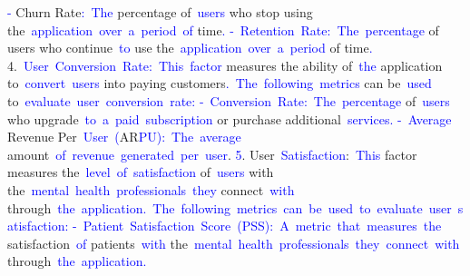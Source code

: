 \documentclass{article}
\begin{document}
\begin{tcolorbox}[colframe=black,colback=white]
{}\textcolor{blue}{-} Churn Rate\textcolor{blue}{:}\textcolor{blue}{~The} percentage of\textcolor{blue}{~users} who stop using the\textcolor{blue}{~application}\textcolor{blue}{~over}\textcolor{blue}{~a}\textcolor{blue}{~period}\textcolor{blue}{~of} time\textcolor{blue}{.
}\textcolor{blue}{-}\textcolor{blue}{~Ret}\textcolor{blue}{ention}\textcolor{blue}{~Rate}\textcolor{blue}{:}\textcolor{blue}{~The}\textcolor{blue}{~percentage} of users who continue\textcolor{blue}{~to} use the\textcolor{blue}{~application}\textcolor{blue}{~over}\textcolor{blue}{~a}\textcolor{blue}{~period} of time\textcolor{blue}{.
}4.\textcolor{blue}{~User}\textcolor{blue}{~Conversion}\textcolor{blue}{~Rate}\textcolor{blue}{:}\textcolor{blue}{~This}\textcolor{blue}{~factor} measures the ability of\textcolor{blue}{~the} application to\textcolor{blue}{~convert}\textcolor{blue}{~users} into paying customers\textcolor{blue}{.}\textcolor{blue}{~The}\textcolor{blue}{~following}\textcolor{blue}{~metrics} can be\textcolor{blue}{~used} to\textcolor{blue}{~evaluate}\textcolor{blue}{~user}\textcolor{blue}{~conversion}\textcolor{blue}{~rate}\textcolor{blue}{:
}\textcolor{blue}{-}\textcolor{blue}{~Conversion}\textcolor{blue}{~Rate}\textcolor{blue}{:}\textcolor{blue}{~The}\textcolor{blue}{~percentage} of\textcolor{blue}{~users} who upgrade\textcolor{blue}{~to}\textcolor{blue}{~a}\textcolor{blue}{~paid}\textcolor{blue}{~subscription} or purchase additional\textcolor{blue}{~services}\textcolor{blue}{.
}\textcolor{blue}{-}\textcolor{blue}{~Average} Revenue Per\textcolor{blue}{~User}\textcolor{blue}{~(}AR\textcolor{blue}{PU}\textcolor{blue}{):}\textcolor{blue}{~The}\textcolor{blue}{~average} amount\textcolor{blue}{~of}\textcolor{blue}{~revenue}\textcolor{blue}{~generated}\textcolor{blue}{~per}\textcolor{blue}{~user}.
\textcolor{blue}{5}. User\textcolor{blue}{~Satisfaction}:\textcolor{blue}{~This} factor measures the\textcolor{blue}{~level}\textcolor{blue}{~of}\textcolor{blue}{~satisfaction} of\textcolor{blue}{~users} with the\textcolor{blue}{~mental}\textcolor{blue}{~health}\textcolor{blue}{~professionals}\textcolor{blue}{~they} connect\textcolor{blue}{~with} through\textcolor{blue}{~the}\textcolor{blue}{~application}\textcolor{blue}{.}\textcolor{blue}{~The}\textcolor{blue}{~following}\textcolor{blue}{~metrics}\textcolor{blue}{~can}\textcolor{blue}{~be}\textcolor{blue}{~used}\textcolor{blue}{~to}\textcolor{blue}{~evaluate}\textcolor{blue}{~user}\textcolor{blue}{~satisfaction}\textcolor{blue}{:
}\textcolor{blue}{-}\textcolor{blue}{~Patient}\textcolor{blue}{~Satisfaction}\textcolor{blue}{~Score}\textcolor{blue}{~(}\textcolor{blue}{P}\textcolor{blue}{SS}\textcolor{blue}{):}\textcolor{blue}{~A}\textcolor{blue}{~metric}\textcolor{blue}{~that}\textcolor{blue}{~measures}\textcolor{blue}{~the} satisfaction\textcolor{blue}{~of} patients\textcolor{blue}{~with} the\textcolor{blue}{~mental}\textcolor{blue}{~health}\textcolor{blue}{~professionals}\textcolor{blue}{~they}\textcolor{blue}{~connect}\textcolor{blue}{~with} through\textcolor{blue}{~the}\textcolor{blue}{~application}\textcolor{blue}{.
}
\end{tcolorbox}
\end{document}
